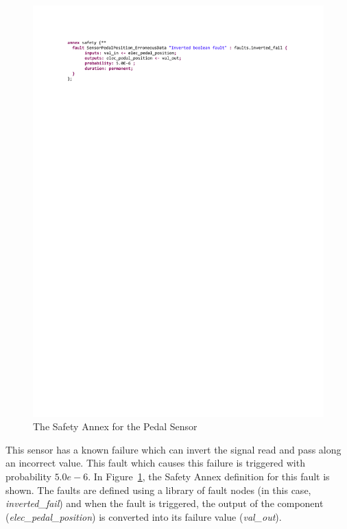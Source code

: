 \begin{figure}[h!]
	\hspace*{-2cm}
	\begin{center}
		\includegraphics[trim=0 690 -10 70,clip,width=1.5\dimexpr\textwidth-2cm\relax]{images/safetyannex_sensorfault.pdf}
		\caption{The Safety Annex for the Pedal Sensor}
		\label{fig:sensorFault}
	\end{center}
	\vspace{-0.3in}
\end{figure}

This sensor has a known failure which can invert the signal read and pass along an incorrect value. This fault which causes this failure is triggered with probability $5.0e-6$. In Figure~\ref{fig:sensorFault}, the Safety Annex definition for this fault is shown. The faults are defined using a library of fault nodes (in this case, \textit{inverted\_fail}) and when the fault is triggered, the output of the component (\textit{elec\_pedal\_position}) is converted into its failure value (\textit{val\_out}). 

